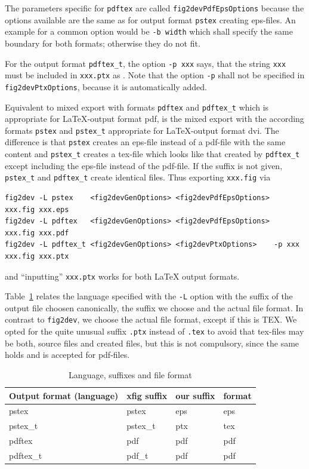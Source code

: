 
The parameters specific for \texttt{pdftex} 
are called \texttt{fig2devPdfEpsOptions} 
because the options available are the same 
as for output format \texttt{pstex} creating eps-files. 
An example for a common option would be \texttt{-b width} 
which shall specify the same boundary for both formats; 
otherwise they do not fit. 

For the output format \texttt{pdftex\_t}, 
the option \texttt{-p xxx} says, 
that the string \texttt{xxx} must be included in \texttt{xxx.ptx} 
as . 
Note that the option \texttt{-p} shall not be specified 
in \texttt{fig2devPtxOptions}, because it is automatically added. 

Equivalent to mixed export with formats \texttt{pdftex} and \texttt{pdftex\_t} 
which is appropriate for \LaTeX-output format pdf, 
is the mixed export with the according formats 
\texttt{pstex} and \texttt{pstex\_t} appropriate for \LaTeX-output format dvi. 
The difference is that \texttt{pstex} creates an eps-file instead of a pdf-file 
with the same content 
and \texttt{pstex\_t} creates a tex-file which looks like that 
created by \texttt{pdftex\_t} except including the eps-file 
instead of the pdf-file. 
If the suffix is not given, 
\texttt{pstex\_t} and \texttt{pdftex\_t} create identical files. 
Thus exporting \texttt{xxx.fig} via 
%
\begin{Verbatim}[fontsize=\scriptsize]
fig2dev -L pstex    <fig2devGenOptions> <fig2devPdfEpsOptions>        xxx.fig xxx.eps   
fig2dev -L pdftex   <fig2devGenOptions> <fig2devPdfEpsOptions>        xxx.fig xxx.pdf   
fig2dev -L pdftex_t <fig2devGenOptions> <fig2devPtxOptions>    -p xxx xxx.fig xxx.ptx
\end{Verbatim}
%
and ``inputting'' \texttt{xxx.ptx} works for both \LaTeX{} output formats. 

Table~\ref{tab:xfigSuffixes} relates the language specified with the \texttt{-L} option 
with the suffix of the output file choosen canonically, the suffix we choose 
and the actual file format. 
In contrast to \texttt{fig2dev}, we choose the actual file format, except if this is TEX. 
We opted for the quite unusual suffix \texttt{.ptx} 
instead of \texttt{.tex} 
to avoid that tex-files may be both, 
source files and created files, 
but this is not compulsory, 
since the same holds and is accepted for pdf-files. 

\begin{longtable}{|l|lll|}
\toprule
Output format (language) & xfig suffix & our suffix & format \\
\midrule
\midrule
\endfirsthead%
\bottomrule%
\caption{\label{tab:xfigSuffixes} Language, suffixes and file format }
\endlastfoot%
pstex                    & pstex       & eps        & eps \\
pstex\_t                 & pstex\_t    & ptx        & tex \\
pdftex                   & pdf         & pdf        & pdf \\
pdftex\_t                & pdf\_t      & pdf        & pdf \\
\end{longtable}


